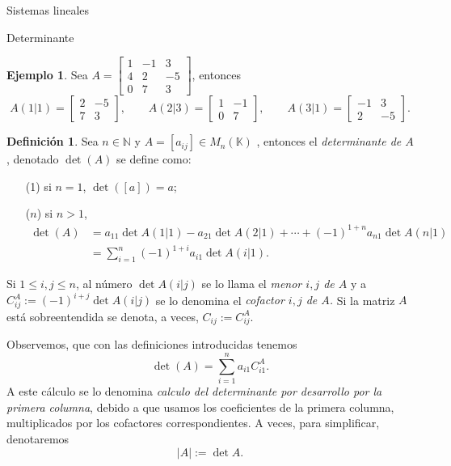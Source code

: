 \documentclass[a4paper,12pt,twoside,spanish,reqno]{amsbook}
\theoremstyle{definition}
\newtheorem{definicion}{Definici\'on}[section]
\newtheorem{ejemplo}{Ejemplo}[section]
\theoremstyle{remark}
\newcommand{\K}{\mathbb K}
\begin{document}
\begin{chapter}{Sistemas lineales}
\begin{section}{Determinante}
    \begin{ejemplo}
        Sea $A= \begin{bmatrix}1&-1&3\\4&2&-5 \\ 0&7&3\end{bmatrix}$,  entonces
        \begin{equation*}
        A(1|1)= \begin{bmatrix} 2&-5 \\ 7&3\end{bmatrix}, \qquad
        A(2|3)= \begin{bmatrix} 1&-1\\0&7\end{bmatrix}, \qquad
        A(3|1)= \begin{bmatrix} -1&3\\2&-5 \end{bmatrix}.
        \end{equation*}
    \end{ejemplo}		
    
    \begin{definicion}
        Sea $n \in \mathbb N$ y $A =[a_{ij}] \in M_n(\K)$ , entonces el \textit{determinante de $A$}, denotado $\det(A)$ se define como:
        \begin{enumerate}
            \item[(1)] si $n=1$,  $\det([a]) =a$;
            \item[($n$)] si $n >1$, 
            \begin{align*}
            \det(A) &=  a_{11}\det A(1|1) - a_{21}\det A(2|1) + \cdots + (-1)^{1+n}  a_{n1}\det A(n|1) \\
            &= \sum_{i=1}^{n} (-1)^{1+i}  a_{i1}\det A(i|1).
            \end{align*}
        \end{enumerate}
        Si  $1 \le i,j \le n$, al número $\det A(i|j)$ se lo llama el \textit{menor $i,j$ de $A$} y a $C^A_{ij}:= (-1)^{i+j} \det A(i|j)$ se lo denomina  el \textit{cofactor $i,j$ de $A$.} Si la matriz $A$ está sobreentendida se denota, a veces, $C_{ij} := C^A_{ij}$.
    \end{definicion}
    
    Observemos, que con las definiciones introducidas  tenemos
    \begin{equation}\label{def-determinante}
    \det(A) = \sum_{i=1}^{n}  a_{i1}C^A_{i1}.
    \end{equation}
    A este cálculo  se lo denomina \textit{calculo del determinante por desarrollo por la primera columna}, debido  a que usamos los coeficientes de la primera columna,  multiplicados por los cofactores correspondientes. A veces, para simplificar,  denotaremos
    $$
    |A| := \det A.
    $$
    

\end{section}
\end{chapter}
\end{document}

